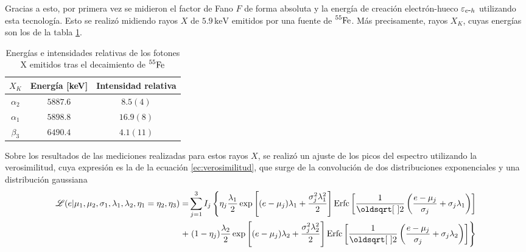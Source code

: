 Gracias a esto, por primera vez se midieron el factor de Fano $F$ de forma absoluta y la energía de creación electrón-hueco $\varepsilon_{e\mbox{-}h}$ utilizando esta tecnología. Esto se realizó midiendo rayos $X$ de $5.9\,\si{\mbox{keV}}$ emitidos por una fuente de $\prescript{55}{}{\mbox{Fe}}$. Más precisamente, rayos $X_{K}$, cuyas energías son los de la tabla \ref{tab:EnergiasXk}.
\begin{table}[h]
\centering
\begin{tabular}{@{}ccc@{}}
\toprule
$X_{K}$         &   Energía [keV]   &   Intensidad relativa \\ \hline \hline
$\alpha_{2}$    &   $5887.6$        &   $8.5 (4)$           \\
$\alpha_{1}$    &   $5898.8$        &   $16.9 (8)$          \\
$\beta_{3}$     &   $6490.4$        &   $4.1 (11)$          \\ \bottomrule
\end{tabular}
\caption{\footnotesize{Energías e intensidades relativas de los fotones X emitidos tras el decaimiento de $\prescript{55}{}{\mbox{Fe}}$}}
\label{tab:EnergiasXk}
\end{table}
Sobre los resultados de las mediciones realizadas para estos rayos $X$, se realizó un ajuste de los picos del espectro utilizando la verosimilitud, cuya expresión es la de la ecuación \eqref{ec:verosimilitud}, que surge de la convolución de dos distribuciones exponenciales y una distribución gaussiana
{\small
\begin{align}
    \Lagr(e|\mu_{1},
            \mu_{2},
            \sigma_{1},
            \lambda_{1},
            \lambda_{2},
            \eta_{1} = \eta_{2},
            \eta_{3})
    = &
    \sum\limits_{j=1}^{3} I_{j}
    \left\{
        \eta_{j}\frac{\lambda_{1}}{2}
        \exp
            \left[
                (e-\mu_{j})\lambda_{1} + \frac{\sigma_{j}^{2}\lambda_{1}^{2}}{2}
            \right]
        \mbox{Erfc}
        \left[
            \frac{1}{\sqrt{2}}
            \left(
                \frac{e - \mu_{j}}{\sigma_{j}}
                +\sigma_{j}\lambda_{1}
            \right)
        \right] \right. \nonumber
        \\
        + &
        \left.
        (1-\eta_{j})\frac{\lambda_{2}}{2}
        \exp
            \left[
                 (e - \mu_{j})\lambda_{2}
                 + \frac{\sigma_{j}^{2}\lambda_{2}^{2}}{2}
            \right]
        \mbox{Erfc}
        \left[
            \frac{1}{\sqrt{2}}
            \left(
                \frac{e - \mu_{j}}{\sigma_{j}}
                +\sigma_{j}\lambda_{2}
            \right)
        \right]
    \right\}
        \label{ec:verosimilitud}
\end{align}
}
